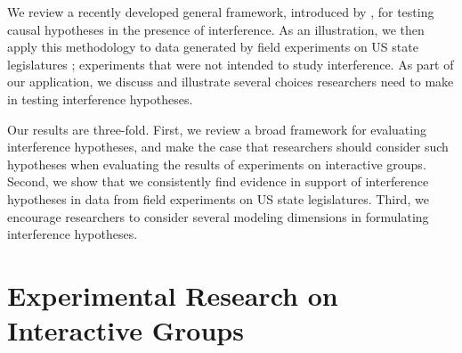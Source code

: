 \documentclass[12pt]{article}
\begin{document}
We review a recently developed general framework, introduced by \citet{bowers2012reasoning}, for testing causal hypotheses in the presence of interference. As an illustration, we then apply this methodology to data generated by field experiments on US state legislatures \citep{butler2011can,bergan2015call}; experiments that were not intended to study interference. As part of our application, we discuss and illustrate several choices researchers need to make in testing interference hypotheses.

Our results are three-fold. First, we review a broad framework for evaluating interference hypotheses, and make the case that researchers should consider such hypotheses when evaluating the results of experiments on interactive groups. Second, we show that we consistently find evidence in support of interference hypotheses in data from field experiments on US state legislatures. Third, we encourage researchers to consider several modeling dimensions in formulating interference hypotheses.



\section{Experimental Research on Interactive Groups}
\end{document}
